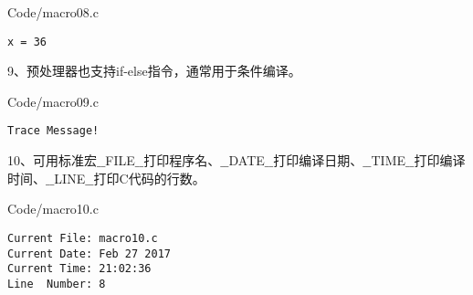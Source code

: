\begin{frame}[fragile]\ft{\secname}
{Code/macro08.c}
\pause 
\begin{lstlisting}[backgroundcolor=\color{red!10}]
x = 36
\end{lstlisting}
\end{frame}

\begin{frame}[fragile]\ft{\secname}
9、预处理器也支持if-else指令，通常用于条件编译。
\end{frame}

\begin{frame}[fragile]\ft{\secname}

{Code/macro09.c}
\pause 
\begin{lstlisting}[backgroundcolor=\color{red!10}]
Trace Message!
\end{lstlisting}
\end{frame}

\begin{frame}[fragile]\ft{\secname}
10、可用标准宏{\tf $\_\_$FILE$\_\_$}打印程序名、{\tf $\_\_$DATE$\_\_$}打印编译日期、{\tf$\_\_$TIME$\_\_$}打印编译时间、{\tf $\_\_$LINE$\_\_$}打印C代码的行数。
\end{frame}

\begin{frame}[fragile]\ft{\secname}
{Code/macro10.c}
\end{frame}

\begin{frame}[fragile]\ft{\secname} 
\begin{lstlisting}[backgroundcolor=\color{red!10}]
Current File: macro10.c
Current Date: Feb 27 2017
Current Time: 21:02:36
Line  Number: 8 
\end{lstlisting}
\end{frame}
